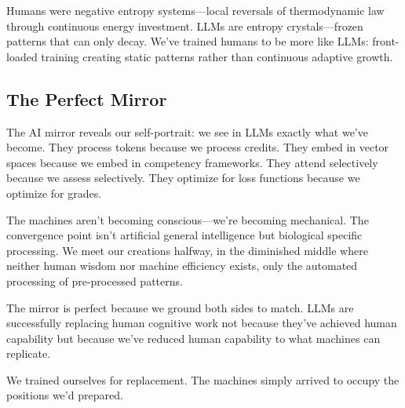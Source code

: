Humans were negative entropy systems---local reversals of thermodynamic law through continuous energy investment. LLMs are entropy crystals---frozen patterns that can only decay. We've trained humans to be more like LLMs: front-loaded training creating static patterns rather than continuous adaptive growth.

\subsection{The Perfect Mirror}

The AI mirror reveals our self-portrait: we see in LLMs exactly what we've become. They process tokens because we process credits. They embed in vector spaces because we embed in competency frameworks. They attend selectively because we assess selectively. They optimize for loss functions because we optimize for grades.

The machines aren't becoming conscious---we're becoming mechanical. The convergence point isn't artificial general intelligence but biological specific processing. We meet our creations halfway, in the diminished middle where neither human wisdom nor machine efficiency exists, only the automated processing of pre-processed patterns.

The mirror is perfect because we ground both sides to match. LLMs are successfully replacing human cognitive work not because they've achieved human capability but because we've reduced human capability to what machines can replicate.

We trained ourselves for replacement. The machines simply arrived to occupy the positions we'd prepared.
